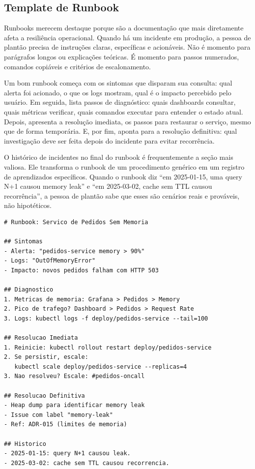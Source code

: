 \subsection{Template de Runbook}

Runbooks merecem destaque porque são a documentação que mais
diretamente afeta a resiliência operacional. Quando há um incidente
em produção, a pessoa de plantão precisa de instruções claras,
específicas e acionáveis. Não é momento para parágrafos longos ou
explicações teóricas. É momento para passos numerados, comandos
copiáveis e critérios de escalonamento.

Um bom runbook começa com os sintomas que disparam sua consulta:
qual alerta foi acionado, o que os logs mostram, qual é o impacto
percebido pelo usuário. Em seguida, lista passos de diagnóstico:
quais dashboards consultar, quais métricas verificar, quais comandos
executar para entender o estado atual. Depois, apresenta a resolução
imediata, os passos para restaurar o serviço, mesmo que de forma
temporária. E, por fim, aponta para a resolução definitiva: qual
investigação deve ser feita depois do incidente para evitar recorrência.

O histórico de incidentes no final do runbook é frequentemente a seção
mais valiosa. Ele transforma o runbook de um procedimento genérico em
um registro de aprendizados específicos. Quando o runbook diz ``em
2025-01-15, uma query N+1 causou memory leak'' e ``em 2025-03-02, cache
sem TTL causou recorrência'', a pessoa de plantão sabe que esses são
cenários reais e prováveis, não hipotéticos.

\begin{lstlisting}[language={}, caption={Template de Runbook}]
# Runbook: Servico de Pedidos Sem Memoria

## Sintomas
- Alerta: "pedidos-service memory > 90%"
- Logs: "OutOfMemoryError"
- Impacto: novos pedidos falham com HTTP 503

## Diagnostico
1. Metricas de memoria: Grafana > Pedidos > Memory
2. Pico de trafego? Dashboard > Pedidos > Request Rate
3. Logs: kubectl logs -f deploy/pedidos-service --tail=100

## Resolucao Imediata
1. Reinicie: kubectl rollout restart deploy/pedidos-service
2. Se persistir, escale:
   kubectl scale deploy/pedidos-service --replicas=4
3. Nao resolveu? Escale: #pedidos-oncall

## Resolucao Definitiva
- Heap dump para identificar memory leak
- Issue com label "memory-leak"
- Ref: ADR-015 (limites de memoria)

## Historico
- 2025-01-15: query N+1 causou leak.
- 2025-03-02: cache sem TTL causou recorrencia.
\end{lstlisting}


